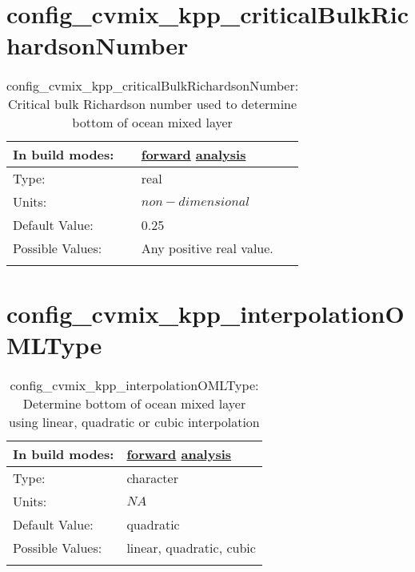 \section[config\_cvmix\_kpp\_criticalBulkRichardsonNumber]{config\_cvmix\_kpp\_criticalBulkRichardsonNumber}
\label{sec:nm_sec_config_cvmix_kpp_criticalBulkRichardsonNumber}
\begin{center}
\begin{longtable}{| p{2.0in} || p{4.0in} |}
    \hline
    In build modes: & \hyperref[subsec:forward_nm_tab_cvmix]{forward} \hyperref[subsec:analysis_nm_tab_cvmix]{analysis} \\
    \hline
    Type: & real \\
    \hline
    Units: & $non-dimensional$ \\
    \hline
    Default Value: & 0.25 \\
    \hline
    Possible Values: & Any positive real value. \\
    \hline
    \caption{config\_cvmix\_kpp\_criticalBulkRichardsonNumber: Critical bulk Richardson number used to determine bottom of ocean mixed layer}
\end{longtable}
\end{center}
\section[config\_cvmix\_kpp\_interpolationOMLType]{config\_cvmix\_kpp\_interpolationOMLType}
\label{sec:nm_sec_config_cvmix_kpp_interpolationOMLType}
\begin{center}
\begin{longtable}{| p{2.0in} || p{4.0in} |}
    \hline
    In build modes: & \hyperref[subsec:forward_nm_tab_cvmix]{forward} \hyperref[subsec:analysis_nm_tab_cvmix]{analysis} \\
    \hline
    Type: & character \\
    \hline
    Units: & $NA$ \\
    \hline
    Default Value: & quadratic \\
    \hline
    Possible Values: & linear, quadratic, cubic \\
    \hline
    \caption{config\_cvmix\_kpp\_interpolationOMLType: Determine bottom of ocean mixed layer using linear, quadratic or cubic interpolation}
\end{longtable}
\end{center}
